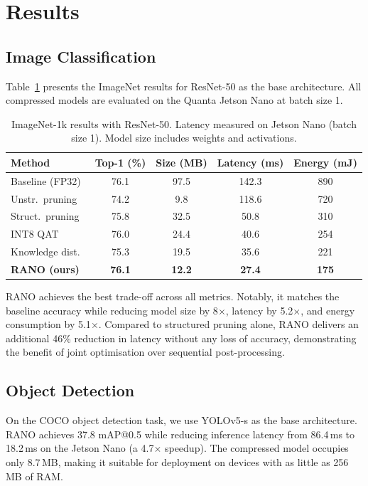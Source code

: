 \section{Results}

\subsection{Image Classification}

Table~\ref{tab:imagenet} presents the ImageNet results for ResNet-50
as the base architecture. All compressed models are evaluated on the
Quanta Jetson Nano at batch size 1.

\begin{table}[htbp]
\centering
\caption{ImageNet-1k results with ResNet-50. Latency measured on Jetson
Nano (batch size 1). Model size includes weights and activations.}
\label{tab:imagenet}
\begin{tabular}{@{}lcccc@{}}
\toprule
\textbf{Method} & \textbf{Top-1 (\%)} & \textbf{Size (MB)} & \textbf{Latency (ms)} & \textbf{Energy (mJ)} \\
\midrule
Baseline (FP32)       & 76.1 & 97.5  & 142.3 & 890 \\
Unstr.\ pruning       & 74.2 & 9.8   & 118.6 & 720 \\
Struct.\ pruning      & 75.8 & 32.5  & 50.8  & 310 \\
INT8 QAT              & 76.0 & 24.4  & 40.6  & 254 \\
Knowledge dist.\      & 75.3 & 19.5  & 35.6  & 221 \\
\textbf{RANO (ours)}  & \textbf{76.1} & \textbf{12.2} & \textbf{27.4} & \textbf{175} \\
\bottomrule
\end{tabular}
\end{table}

RANO achieves the best trade-off across all metrics. Notably, it matches
the baseline accuracy while reducing model size by 8$\times$, latency by
5.2$\times$, and energy consumption by 5.1$\times$. Compared to
structured pruning alone, RANO delivers an additional 46\% reduction in
latency without any loss of accuracy, demonstrating the benefit of joint
optimisation over sequential post-processing.

\subsection{Object Detection}

On the COCO object detection task, we use YOLOv5-s as the base
architecture. RANO achieves 37.8 mAP@0.5 while reducing inference
latency from 86.4\,ms to 18.2\,ms on the Jetson Nano (a 4.7$\times$
speedup). The compressed model occupies only 8.7\,MB, making it suitable
for deployment on devices with as little as 256\,MB of RAM.

